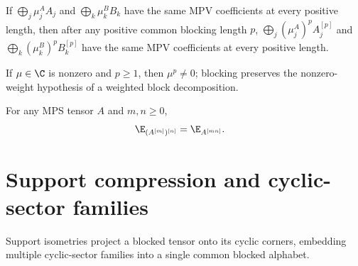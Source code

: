\begin{lemma}%
    \label{thm:same_mpv2_pos_to_tensor_from_blocks_block_power}
    \leanok
    If $\bigoplus_j\mu_j^AA_j$ and $\bigoplus_k\mu_k^BB_k$ have the same MPV
    coefficients at every positive length, then after any positive common
    blocking length $p$, $\bigoplus_j(\mu_j^A)^pA_j^{[p]}$ and
    $\bigoplus_k(\mu_k^B)^pB_k^{[p]}$ have the same MPV coefficients at every
    positive length.
\end{lemma}

\begin{lemma}%
    \label{lem:block_weights_ne_zero}
    \leanok
    If $\mu\in\C$ is nonzero and $p\ge1$, then $\mu^p\neq0$; blocking
    preserves the nonzero-weight hypothesis of a weighted block decomposition.
\end{lemma}

\begin{lemma}%
    \label{thm:iterated_blocking_transfer}
    \leanok
    For any MPS tensor $A$ and $m,n\ge0$,
    \begin{align}
        \E_{(A^{[m]})^{[n]}}
         & =
        \E_{A^{[mn]}}.
        \label{eq:canonical_iterated_blocking}
    \end{align}
\end{lemma}

\section{Support compression and cyclic-sector families}
\label{sec:app_canonical_cyclic_sectors}

Support isometries project a blocked tensor onto its cyclic corners, embedding
multiple cyclic-sector families into a single common blocked alphabet.

